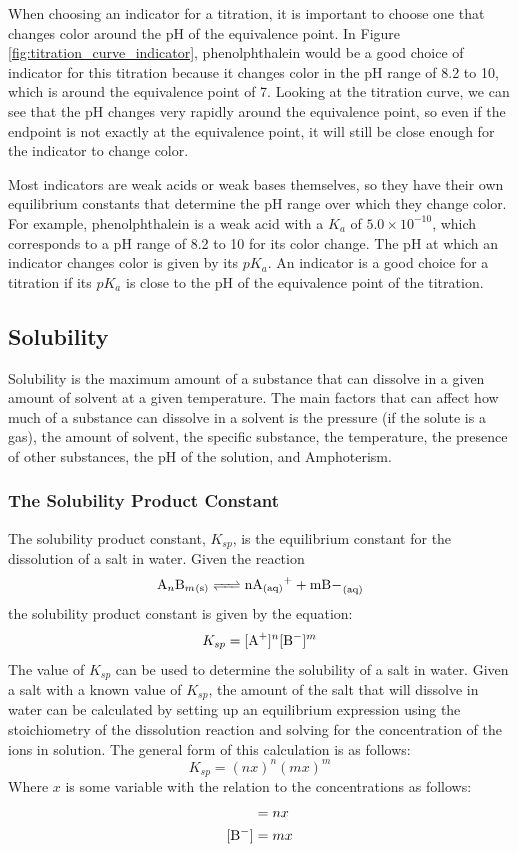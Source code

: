 When choosing an indicator for a titration, it is important to choose one that changes color around the pH of the equivalence point. In Figure \ref{fig:titration_curve_indicator}, phenolphthalein would be a good choice of indicator for this titration because it changes color in the pH range of 8.2 to 10, which is around the equivalence point of 7. Looking at the titration curve, we can see that the pH changes very rapidly around the equivalence point, so even if the endpoint is not exactly at the equivalence point, it will still be close enough for the indicator to change color.

Most indicators are weak acids or weak bases themselves, so they have their own equilibrium constants that determine the pH range over which they change color. For example, phenolphthalein is a weak acid with a $K_a$ of $5.0 \times 10^{-10}$, which corresponds to a pH range of 8.2 to 10 for its color change. The pH at which an indicator changes color is given by its $pK_a$. An indicator is a good choice for a titration if its $pK_a$ is close to the pH of the equivalence point of the titration.

\subsection{Solubility}
Solubility is the maximum amount of a substance that can dissolve in a given amount of solvent at a given temperature. The main factors that can affect how much of a substance can dissolve in a solvent is the pressure (if the solute is a gas), the amount of solvent, the specific substance, the temperature, the presence of other substances, the pH of the solution, and Amphoterism.
\subsubsection{The Solubility Product Constant}
The solubility product constant, $K_{sp}$, is the equilibrium constant for the dissolution of a salt in water. Given the reaction
\[\ce{A_nB_m_{(s)} <=> nA+_{(aq)} + mB-_{(aq)}}\]
the solubility product constant is given by the equation:
\begin{equation}\label{eq:Ksp}
    K_{sp} = [\ce{A+}]^n [\ce{B-}]^m
\end{equation}
The value of $K_{sp}$ can be used to determine the solubility of a salt in water. Given a salt  with a known value of $K_{sp}$, the amount of the salt that will dissolve in water can be calculated by setting up an equilibrium expression using the stoichiometry of the dissolution reaction and solving for the concentration of the ions in solution. The general form of this calculation is as follows:
\begin{equation}\label{eq:Ksp_general}
    K_{sp} = (nx)^n (mx)^m
\end{equation}
Where $x$ is some variable with the relation to the concentrations as follows:
\begin{align}
    [\ce{A+}] &= nx \label{eq:A_concentration}\\
    [\ce{B-}] &= mx \label{eq:B_concentration}
\end{align}
